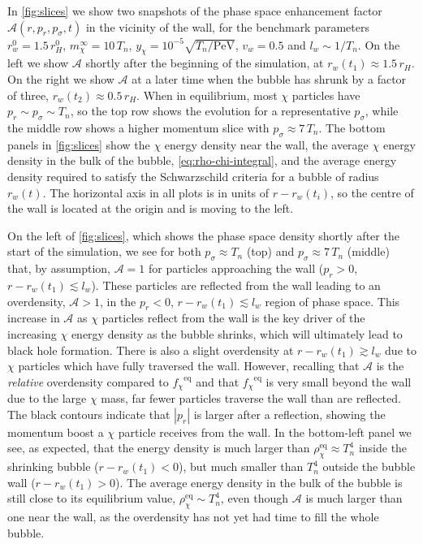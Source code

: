 \documentclass[
onecolumn, %
11pt, %
tightenlines,
superscriptaddress, %
nofootinbib, %
preprintnumbers, %
prd %
]{revtex4-1}
\newcommand{\f}{\ensuremath{f_\chi}\xspace}
\newcommand{\A}{\ensuremath{\mathcal A}\xspace}
\begin{document}
In \cref{fig:slices} we show two snapshots of the phase space enhancement factor $\A(r,p_r,p_\sigma,t)$ in the vicinity of the wall, for the benchmark parameters $r_w^0 = 1.5 \,r_H^0$, $m_\chi^\infty = 10 \,T_n$, $y_\chi = 10^{-5} \sqrt{T_n/\text{PeV}}$, $v_w = 0.5$ and $l_w \sim 1/T_n$.  On the left we show $\A$ shortly after the beginning of the simulation, at $r_w(t_1) \approx 1.5\,r_H$.  On the right we show $\A$ at a later time when the bubble has shrunk by a factor of three, $r_w(t_2) \approx 0.5\,r_H$.  When in equilibrium, most $\chi$ particles have $p_r\sim p_\sigma \sim T_n$, so the top row shows the evolution for a representative $p_\sigma$, while the middle row shows a higher momentum slice with $p_\sigma \approx 7\,T_n$.  The bottom panels in \cref{fig:slices} show the $\chi$ energy density near the wall, the average $\chi$ energy density in the bulk of the bubble, \cref{eq:rho-chi-integral}, and the average energy density required to satisfy the Schwarzschild criteria for a bubble of radius $r_w(t)$.  The horizontal axis in all plots is in units of $r-r_w(t_i)$, so the centre of the wall is located at the origin and is moving to the left.

On the left of \cref{fig:slices}, which shows the phase space density shortly after the start of the simulation, we see for both $p_\sigma \approx T_n$ (top) and $p_\sigma \approx 7\,T_n$ (middle) that, by assumption, $\mathcal{A}=1$ for particles approaching the wall ($p_r > 0$, $r-r_w(t_1) \lesssim l_w$).  These particles are reflected from the wall leading to an overdensity, $\mathcal{A}>1$, in the $p_r < 0$, $r-r_w(t_1) \lesssim l_w$ region of phase space.  This increase in $\A$ as $\chi$ particles reflect from the wall is the key driver of the increasing $\chi$ energy density as the bubble shrinks, which will ultimately lead to black hole formation.  There is also a slight overdensity at $r - r_w(t_1) \gtrsim l_w$ due to $\chi$ particles which have fully traversed the wall. However, recalling that $\A$ is the \emph{relative} overdensity compared to $\f^\text{eq}$ and that $\f^\text{eq}$ is very small beyond the wall due to the large $\chi$ mass, far fewer particles traverse the wall than are reflected.  The black contours indicate that $|p_r|$ is larger after a reflection, showing the momentum boost a $\chi$ particle receives from the wall.  In the bottom-left panel we see, as expected, that the energy density is much larger than $\rho_\chi^\text{eq} \approx T_n^4$ inside the shrinking bubble ($r-r_w(t_1) < 0$), but much smaller than $T_n^4$ outside the bubble wall ($r-r_w(t_1) > 0$).  The average energy density in the bulk of the bubble is still close to its equilibrium value, $\rho_\chi^\text{eq} \sim T_n^4$, even though $\A$ is much larger than one near the wall, as the overdensity has not yet had time to fill the whole bubble.
\end{document}
